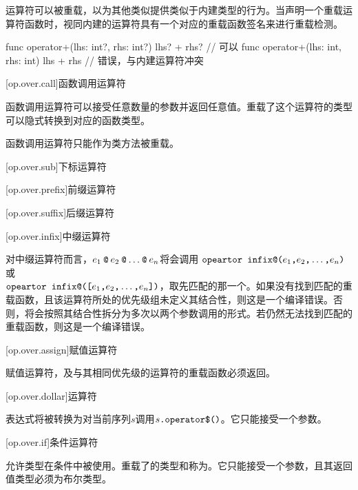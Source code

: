 \pnum
运算符可以被重载，以为其他类似提供类似于内建类型的行为。当声明一个重载运算符函数时，视同内建的运算符具有一个对应的重载函数签名来进行重载检测。

\enterexample
\begin{codeblock}
func operator+(lhs: int?, rhs: int?) { lhs? + rhs? } // 可以
func operator+(lhs: int, rhs: int) { lhs + rhs } // 错误，与内建运算符冲突
\end{codeblock}
\exitexample

[op.over.call]{函数调用运算符}

\pnum
函数调用运算符可以接受任意数量的参数并返回任意值。重载了这个运算符的类型可以隐式转换到对应的函数类型。

\pnum
函数调用运算符只能作为类方法被重载。

[op.over.sub]{下标运算符}

[op.over.prefix]{前缀运算符}

[op.over.suffix]{后缀运算符}

[op.over.infix]{中缀运算符}

\pnum
对中缀运算符而言，$e_1\mathbin{\texttt{@}}e_2\mathbin{\texttt{@}}\ldots\mathbin{\texttt{@}}e_n$将会调用
$\texttt{opeartor infix@(}e_1\texttt{,}e_2\texttt{,}\ldots\texttt{,}e_n\texttt{)}$或\\$\texttt{opeartor infix@([}e_1\texttt{,}e_2\texttt{,}\ldots\texttt{,}e_n\texttt{])}$，取先匹配的那一个。如果没有找到匹配的重载函数，且该运算符所处的优先级组未定义其结合性，则这是一个编译错误。否则，将会按照其结合性拆分为多次以两个参数调用的形式。若仍然无法找到匹配的重载函数，则这是一个编译错误。

[op.over.assign]{赋值运算符}

\pnum
赋值运算符，及与其相同优先级的运算符的重载函数必须返回。

[op.over.dollar]{\tcode{\$}运算符}

\pnum
\tcode{\$}表达式将被转换为对当前序列$s$调用$s\texttt{.operator\$()}$。它只能接受一个参数。

[op.over.if]{条件运算符}

\pnum
{}允许类型在条件中被使用。重载了的类型和称为。它只能接受一个参数，且其返回值类型必须为布尔类型。

